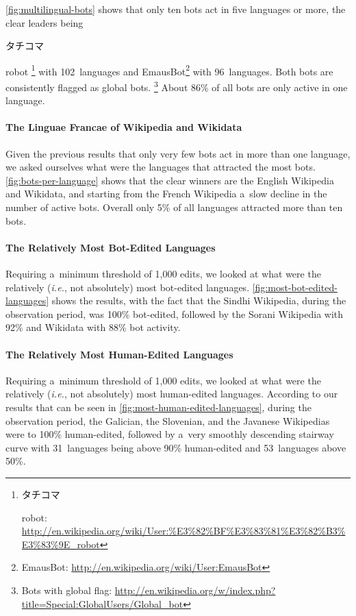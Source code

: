 \documentclass{sig-alternate}
\newcommand{\inlinelistingsize}{\fontsize{8pt}{11pt}}
\let\oldurl\url
\renewcommand{\url}[1]{\inlinelistingsize\oldurl{#1}}
\begin{document}
\autoref{fig:multilingual-bots} shows that only ten bots
act in five languages or more, the clear leaders
being \begin{CJK}{UTF8}{min}タチコマ\end{CJK} robot%
\footnote{\begin{CJK}{UTF8}{min}タチコマ\end{CJK} robot:
\url{http://en.wikipedia.org/wiki/User:\%E3\%82\%BF\%E3\%83\%81\%E3\%82\%B3\%E3\%83\%9E_robot}} with 102~languages and
EmausBot\footnote{EmausBot:
\url{http://en.wikipedia.org/wiki/User:EmausBot}}
with 96~languages.
Both bots are consistently flagged as global bots.%
\footnote{Bots with global flag: \url{http://en.wikipedia.org/w/index.php?title=Special:GlobalUsers/Global_bot}}
About 86\% of all bots are only active in one language.

\paragraph{The Linguae Francae of Wikipedia and Wikidata}

Given the previous results that only very few bots
act in more than one language, we asked ourselves
what were the languages that attracted the most bots.
\autoref{fig:bots-per-language} shows that the clear winners
are the English Wikipedia and Wikidata,
and starting from the French Wikipedia a~slow decline
in the number of active bots.
Overall only 5\% of all languages attracted more than ten bots.

\paragraph{The Relatively Most Bot-Edited Languages}

Requiring a~minimum threshold of 1,000 edits,
we looked at what were the relatively
(\emph{i.e.}, not absolutely) most bot-edited languages.
\autoref{fig:most-bot-edited-languages} shows the results,
with the fact that the Sindhi Wikipedia,
during the observation period, was 100\% bot-edited,
followed by the Sorani Wikipedia with 92\%
and Wikidata with 88\% bot activity.

\paragraph{The Relatively Most Human-Edited Languages}

Requiring a~minimum threshold of 1,000 edits,
we looked at what were the relatively
(\emph{i.e.}, not absolutely) most human-edited languages.
According to our results that can be seen in \autoref{fig:most-human-edited-languages},
during the observation period,
the Galician, the Slovenian, and the Javanese Wikipedias
were to 100\% human-edited, followed by
a~very smoothly descending stairway curve
with 31~languages being above 90\% human-edited
and 53~languages above 50\%.
\end{document}
